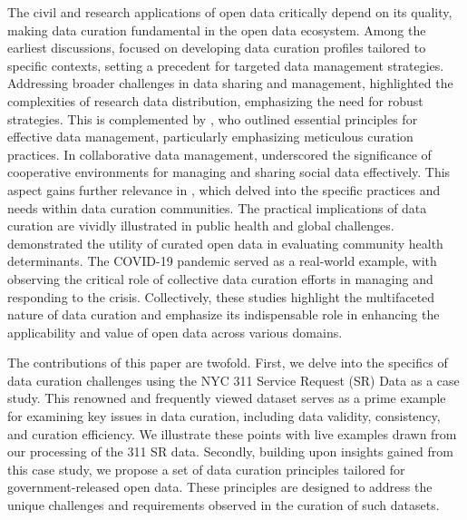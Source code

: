 \documentclass[12pt, titlepage]{article}
\begin{document}
The civil and research applications of open data critically depend on
its quality, making data curation fundamental in the open data
ecosystem. Among the earliest discussions,
\citet{witt2009constructing} focused on developing data curation
profiles tailored to specific contexts, setting a precedent for
targeted data management strategies. Addressing broader challenges in
data sharing and management, \citet{borgman2012conundrum} highlighted
the complexities of research data distribution, emphasizing the need
for robust strategies. This is complemented by \citet{hart2016ten},
who outlined essential principles for effective data management,
particularly emphasizing meticulous curation practices. In
collaborative data management, \citet{beheshti2019datasynapse}
underscored the significance of cooperative environments for managing
and sharing social data effectively. This aspect gains further
relevance in \citet{mclure2014data}, which delved into the specific
practices and needs within data curation communities. The practical
implications of data curation are vividly illustrated in public health
and global challenges. \citet{cantor2018facets} demonstrated the
utility of curated open data in evaluating community health
determinants. The COVID-19 pandemic served as a real-world example,
with \citet{shankar2021data} observing the critical role of collective
data curation efforts in managing and responding to the
crisis. Collectively, these studies highlight the multifaceted nature
of data curation and emphasize its indispensable role in enhancing the
applicability and value of open data across various domains.


The contributions of this paper are twofold. First, we delve into
the specifics of data curation challenges using the NYC 311 Service
Request (SR) Data as a case study. This renowned and frequently viewed 
dataset serves as a prime example for examining key issues in data curation, 
including data validity, consistency, and curation efficiency. 
We illustrate these points with live examples drawn from our 
processing of the 311 SR data. Secondly, building upon insights 
gained from this case study, we propose a set of data curation 
principles tailored for government-released open data. These 
principles are designed to address the unique challenges 
and requirements observed in the curation of such datasets.
\end{document}
